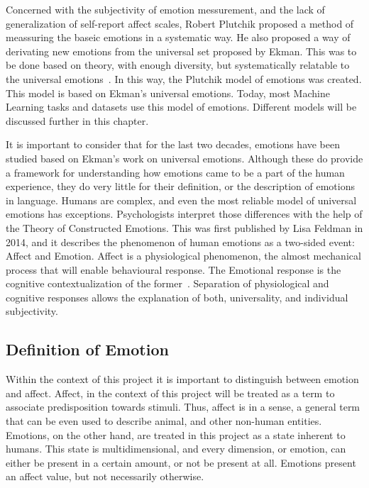 Concerned with the subjectivity of emotion messurement, and the lack of generalization of self-report affect scales, Robert Plutchik proposed a method of meassuring the baseic emotions in a systematic way. He also proposed a way of derivating new emotions from the universal set proposed by Ekman. This was to be done based on theory, with enough diversity, but systematically relatable to the universal emotions~\cite{plutchik2013measurement}. In this way, the Plutchik model of emotions was created. This model is based on Ekman's universal emotions. Today, most Machine Learning tasks and datasets use this model of emotions. Different models will be discussed further in this chapter.

It is important to consider that for the last two decades, emotions have been studied based on Ekman's work on universal emotions. Although these do provide a framework for understanding how emotions came to be a part of the human experience, they do very little for their definition, or the description of emotions in language. Humans are complex, and even the most reliable model of universal emotions has exceptions. Psychologists interpret those differences with the help of the Theory of Constructed Emotions. This was first published by Lisa Feldman in 2014, and it describes the phenomenon of human emotions as a two-sided event: Affect and Emotion. Affect is a physiological phenomenon, the almost mechanical process that will enable behavioural response. The Emotional response is the cognitive contextualization of the former~\cite{feldman2014constructed}. Separation of physiological and cognitive responses allows the explanation of both, universality, and individual subjectivity.


\subsection{Definition of Emotion}\label{sub:Definition of Emotion}
Within the context of this project it is important to distinguish between emotion and affect. Affect, in the context of this project will be treated as a term to associate predisposition towards stimuli. Thus, affect is in a sense, a general term that can be even used to describe animal, and other non-human entities. Emotions, on the other hand, are treated in this project as a state inherent to humans. This state is multidimensional, and every dimension, or emotion, can either be present in a certain amount, or not be present at all.
Emotions present an affect value, but not necessarily otherwise.


